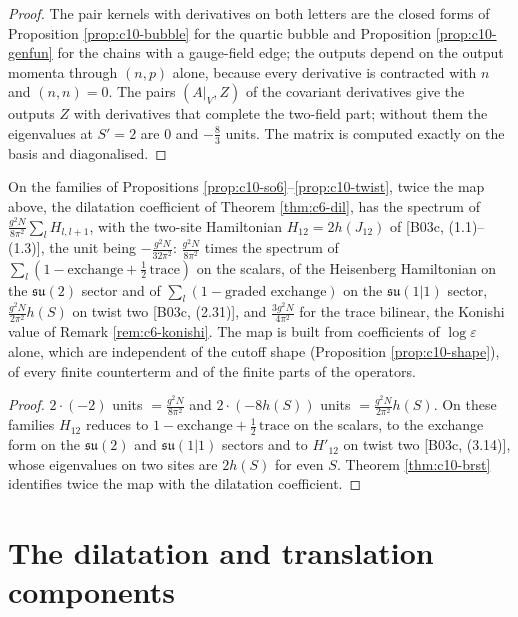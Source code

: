 \begin{proof}
The pair kernels with derivatives on both letters are the closed forms of Proposition \ref{prop:c10-bubble} for the quartic bubble and Proposition \ref{prop:c10-genfun} for the chains with a gauge-field edge; the outputs depend on the output momenta through $(n,p)$ alone, because every derivative is contracted with $n$ and $(n,n)=0$. The pairs $(A|_V,Z)$ of the covariant derivatives give the outputs $Z$ with derivatives that complete the two-field part; without them the eigenvalues at $S'=2$ are $0$ and $-\tfrac83$ units. The matrix is computed exactly on the basis and diagonalised.
\end{proof}

\begin{corollary}
\label{cor:c10-beisert}
On the families of Propositions \ref{prop:c10-so6}--\ref{prop:c10-twist}, twice the map above, the dilatation coefficient of Theorem \ref{thm:c6-dil}, has the spectrum of $\frac{g^2N}{8\pi^2}\sum_lH_{l,l+1}$, with the two-site Hamiltonian $H_{12}=2h(J_{12})$ of [B03c, (1.1)--(1.3)], the unit being $-\frac{g^2N}{32\pi^2}$: $\frac{g^2N}{8\pi^2}$ times the spectrum of $\sum_l(1-\text{exchange}+\tfrac12\,\text{trace})$ on the scalars, of the Heisenberg Hamiltonian on the $\mathfrak{su}(2)$ sector and of $\sum_l(1-\text{graded exchange})$ on the $\mathfrak{su}(1|1)$ sector, $\frac{g^2N}{2\pi^2}h(S)$ on twist two [B03c, (2.31)], and $\frac{3g^2N}{4\pi^2}$ for the trace bilinear, the Konishi value of Remark \ref{rem:c6-konishi}. The map is built from coefficients of $\log\varepsilon$ alone, which are independent of the cutoff shape (Proposition \ref{prop:c10-shape}), of every finite counterterm and of the finite parts of the operators.
\end{corollary}

\begin{proof}
$2\cdot(-2)$ units $=\frac{g^2N}{8\pi^2}$ and $2\cdot(-8h(S))$ units $=\frac{g^2N}{2\pi^2}h(S)$. On these families $H_{12}$ reduces to $1-\text{exchange}+\tfrac12\,\text{trace}$ on the scalars, to the exchange form on the $\mathfrak{su}(2)$ and $\mathfrak{su}(1|1)$ sectors and to $H'_{12}$ on twist two [B03c, (3.14)], whose eigenvalues on two sites are $2h(S)$ for even $S$. Theorem \ref{thm:c10-brst} identifies twice the map with the dilatation coefficient.
\end{proof}

\section{The dilatation and translation components}

